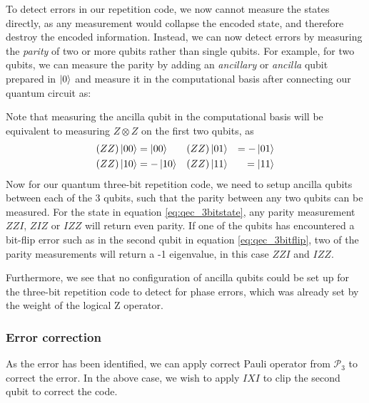 To detect errors in our repetition code, we now cannot measure the states directly, as any measurement would collapse the encoded state, and therefore destroy the encoded information. Instead, we can now detect errors by measuring the \emph{parity} of two or more qubits rather than single qubits. For example, for two qubits, we can measure the parity by adding an \emph{ancillary} or \emph{ancilla} qubit prepared in $\ket{0}$ and measure it in the computational basis after connecting our quantum circuit as:
\begin{center}
\end{center}
Note that measuring the ancilla qubit in the computational basis will be equivalent to measuring $Z\otimes Z$ on the first two qubits, as
\begin{equation}
\begin{aligned}
    (ZZ)\ket{00} &= \ket{00} && (ZZ)\ket{01} &= -\ket{01} \\
    (ZZ)\ket{10} &= -\ket{10} && (ZZ)\ket{11} &= \ket{11}
\end{aligned}
\end{equation}
Now for our quantum three-bit repetition code, we need to setup ancilla qubits between each of the 3 qubits, such that the parity between any two qubits can be measured. For the state in equation \ref{eq:qec_3bitstate}, any parity measurement $ZZI$, $ZIZ$ or $IZZ$ will return even parity. If one of the qubits has encountered a bit-flip error such as in the second qubit in equation \ref{eq:qec_3bitflip}, two of the parity measurements will return a -1 eigenvalue, in this case $ZZI$ and $IZZ$.

Furthermore, we see that no configuration of ancilla qubits could be set up for the three-bit repetition code to detect for phase errors, which was already set by the weight of the logical Z operator.

\subsubsection{Error correction}

As the error has been identified, we can apply correct Pauli operator from $\mathcal{P}_3$ to correct the error. In the above case, we wish to apply $IXI$ to clip the second qubit to correct the code.


